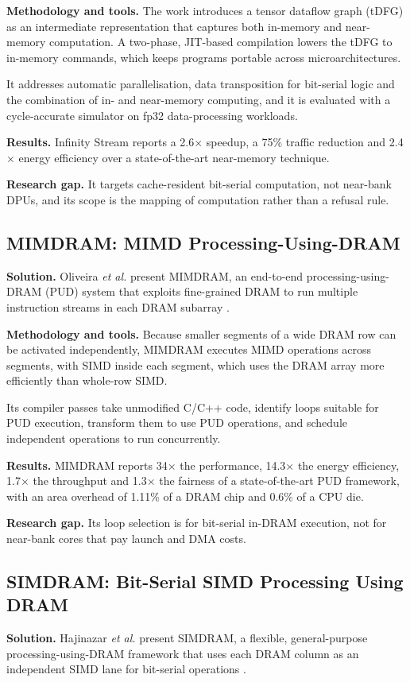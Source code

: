 \documentclass{ieeeaccess}
\begin{document}
\textbf{Methodology and tools.} The work introduces a tensor dataflow graph (tDFG) as an intermediate representation that captures both in-memory and near-memory computation. A two-phase, JIT-based compilation lowers the tDFG to in-memory commands, which keeps programs portable across microarchitectures.

It addresses automatic parallelisation, data transposition for bit-serial logic and the combination of in- and near-memory computing, and it is evaluated with a cycle-accurate simulator on fp32 data-processing workloads.

\textbf{Results.} Infinity Stream reports a 2.6$\times$ speedup, a 75\% traffic reduction and 2.4$\times$ energy efficiency over a state-of-the-art near-memory technique.

\textbf{Research gap.} It targets cache-resident bit-serial computation, not near-bank DPUs, and its scope is the mapping of computation rather than a refusal rule.

\subsection{MIMDRAM: MIMD Processing-Using-DRAM}
\textbf{Solution.} Oliveira \emph{et al.} present MIMDRAM, an end-to-end processing-using-DRAM (PUD) system that exploits fine-grained DRAM to run multiple instruction streams in each DRAM subarray \cite{oliveira2024mimdram}.

\textbf{Methodology and tools.} Because smaller segments of a wide DRAM row can be activated independently, MIMDRAM executes MIMD operations across segments, with SIMD inside each segment, which uses the DRAM array more efficiently than whole-row SIMD.

Its compiler passes take unmodified C/C++ code, identify loops suitable for PUD execution, transform them to use PUD operations, and schedule independent operations to run concurrently.

\textbf{Results.} MIMDRAM reports 34$\times$ the performance, 14.3$\times$ the energy efficiency, 1.7$\times$ the throughput and 1.3$\times$ the fairness of a state-of-the-art PUD framework, with an area overhead of 1.11\% of a DRAM chip and 0.6\% of a CPU die.

\textbf{Research gap.} Its loop selection is for bit-serial in-DRAM execution, not for near-bank cores that pay launch and DMA costs.

\subsection{SIMDRAM: Bit-Serial SIMD Processing Using DRAM}
\textbf{Solution.} Hajinazar \emph{et al.} present SIMDRAM, a flexible, general-purpose processing-using-DRAM framework that uses each DRAM column as an independent SIMD lane for bit-serial operations \cite{hajinazar2021simdram}.
\end{document}
